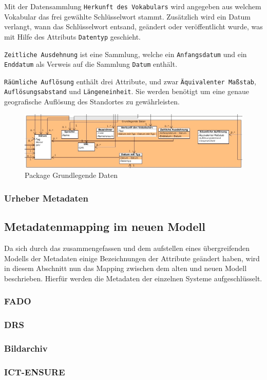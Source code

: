 Mit der Datensammlung \texttt{Herkunft des Vokabulars} wird angegeben aus welchem Vokabular das frei gew\"ahlte Schl\"usselwort stammt. Zus\"atzlich wird ein Datum verlangt, wann das Schl\"usselwort entsand, ge\"andert oder ver\"offentlicht wurde, was mit Hilfe des Attributs \texttt{Datentyp} geschieht.

\texttt{Zeitliche Ausdehnung} ist eine Sammlung, welche ein \texttt{Anfangsdatum} und ein \texttt{Enddatum} als Verweis auf die Sammlung \texttt{Datum} enth\"alt.

\texttt{R\"\"aumliche Aufl\"osung} enth\"alt drei Attribute, und zwar \texttt{\"Aquivalenter Ma\ss{}stab}, \texttt{Aufl\"osungsabstand} und \texttt{L\"angeneinheit}. Sie werden ben\"otigt um eine genaue geografische Aufl\"osung des Standortes zu gew\"ahrleisten.


\begin{figure}[!ht]
\centering
\includegraphics[width=16cm]{Bilder/Datenmodell/Package-Grundlegende-Daten.jpg}
\caption{Package Grundlegende Daten}
\label{Package Grundlegende Daten}
\centering
\end{figure}

\subsubsection{Urheber Metadaten} \label{Urheber Metadaten}
\subsection{Metadatenmapping im neuen Modell}\label{Metadatenmapping}
Da sich durch das zusammengefassen und dem aufstellen eines \"ubergreifenden Modells der Metadaten einige Bezeichnungen der Attribute ge\"andert haben, wird in diesem Abschnitt nun das Mapping zwischen dem alten und neuen Modell beschrieben. Hierf\"ur werden die Metadaten der einzelnen Systeme aufgeschl\"usselt.

\subsubsection{FADO}
\subsubsection{DRS}
\subsubsection{Bildarchiv}
\subsubsection{ICT-ENSURE}